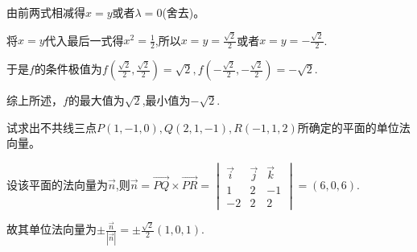 \documentclass[twoside,12pt]{hnuexam}
\begin{document}
\begin{questions}
\begin{solution}
		由前两式相减得$x=y$或者$\lambda=0$(舍去)。

		将$x=y$代入最后一式得$x^2=\frac{1}{2}$,所以$x=y=\frac{\sqrt{2}}{2}$或者$x=y=-\frac{\sqrt{2}}{2}$.

		于是$f$的条件极值为$f(\frac{\sqrt{2}}{2},\frac{\sqrt{2}}{2})=\sqrt{2},f(-\frac{\sqrt{2}}{2},-\frac{\sqrt{2}}{2})=-\sqrt{2}.$

		综上所述，$f$的最大值为$\sqrt{2}$,最小值为$-\sqrt{2}.$
	\end{solution}

	\question
		试求出不共线三点$P(1,-1,0),Q(2,1,-1),R(-1,1,2)$所确定的平面的单位法向量。
		\begin{solution}
			设该平面的法向量为$\vec{n}$,则$\vec{n}=\vec{PQ}\times\vec{PR}=\begin{vmatrix}
					\vec{i} & \vec{j} & \vec{k} \\
					1       & 2       & -1      \\
					-2      & 2       & 2
				\end{vmatrix}=(6,0,6).$
	
			故其单位法向量为$\pm\frac{\vec{n}}{|\vec{n}|}=\pm\frac{\sqrt{2}}{2}(1,0,1).$
		\end{solution}
\end{questions}
\end{document}
